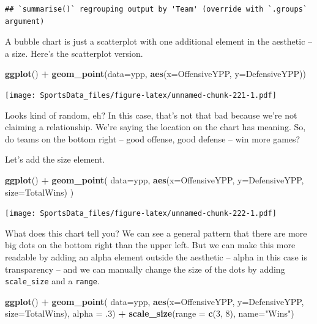 \documentclass[
]{book}
\newenvironment{Shaded}{\begin{snugshade}}{\end{snugshade}}
\newcommand{\DataTypeTok}[1]{\textcolor[rgb]{0.13,0.29,0.53}{#1}}
\newcommand{\DecValTok}[1]{\textcolor[rgb]{0.00,0.00,0.81}{#1}}
\newcommand{\FloatTok}[1]{\textcolor[rgb]{0.00,0.00,0.81}{#1}}
\newcommand{\KeywordTok}[1]{\textcolor[rgb]{0.13,0.29,0.53}{\textbf{#1}}}
\newcommand{\NormalTok}[1]{#1}
\newcommand{\OperatorTok}[1]{\textcolor[rgb]{0.81,0.36,0.00}{\textbf{#1}}}
\newcommand{\StringTok}[1]{\textcolor[rgb]{0.31,0.60,0.02}{#1}}
\begin{document}
\begin{verbatim}
## `summarise()` regrouping output by 'Team' (override with `.groups` argument)
\end{verbatim}

A bubble chart is just a scatterplot with one additional element in the aesthetic -- a size. Here's the scatterplot version.

\begin{Shaded}
\begin{Highlighting}[]
\KeywordTok{ggplot}\NormalTok{() }\OperatorTok{+}\StringTok{ }\KeywordTok{geom_point}\NormalTok{(}\DataTypeTok{data=}\NormalTok{ypp, }\KeywordTok{aes}\NormalTok{(}\DataTypeTok{x=}\NormalTok{OffensiveYPP, }\DataTypeTok{y=}\NormalTok{DefensiveYPP))}
\end{Highlighting}
\end{Shaded}

\texttt{[image: SportsData\_files/figure-latex/unnamed-chunk-221-1.pdf]}

Looks kind of random, eh? In this case, that's not that bad because we're not claiming a relationship. We're saying the location on the chart has meaning. So, do teams on the bottom right -- good offense, good defense -- win more games?

Let's add the size element.

\begin{Shaded}
\begin{Highlighting}[]
\KeywordTok{ggplot}\NormalTok{() }\OperatorTok{+}\StringTok{ }
\StringTok{  }\KeywordTok{geom_point}\NormalTok{(}
    \DataTypeTok{data=}\NormalTok{ypp, }
    \KeywordTok{aes}\NormalTok{(}\DataTypeTok{x=}\NormalTok{OffensiveYPP, }\DataTypeTok{y=}\NormalTok{DefensiveYPP, }\DataTypeTok{size=}\NormalTok{TotalWins)}
\NormalTok{    )}
\end{Highlighting}
\end{Shaded}

\texttt{[image: SportsData\_files/figure-latex/unnamed-chunk-222-1.pdf]}

What does this chart tell you? We can see a general pattern that there are more big dots on the bottom right than the upper left. But we can make this more readable by adding an alpha element outside the aesthetic -- alpha in this case is transparency -- and we can manually change the size of the dots by adding \texttt{scale\_size} and a \texttt{range}.

\begin{Shaded}
\begin{Highlighting}[]
\KeywordTok{ggplot}\NormalTok{() }\OperatorTok{+}\StringTok{ }
\StringTok{  }\KeywordTok{geom_point}\NormalTok{(}
    \DataTypeTok{data=}\NormalTok{ypp, }
    \KeywordTok{aes}\NormalTok{(}\DataTypeTok{x=}\NormalTok{OffensiveYPP, }\DataTypeTok{y=}\NormalTok{DefensiveYPP, }\DataTypeTok{size=}\NormalTok{TotalWins),}
    \DataTypeTok{alpha =} \FloatTok{.3}\NormalTok{) }\OperatorTok{+}\StringTok{ }
\StringTok{  }\KeywordTok{scale_size}\NormalTok{(}\DataTypeTok{range =} \KeywordTok{c}\NormalTok{(}\DecValTok{3}\NormalTok{, }\DecValTok{8}\NormalTok{), }\DataTypeTok{name=}\StringTok{"Wins"}\NormalTok{)}
\end{Highlighting}
\end{Shaded}
\end{document}
